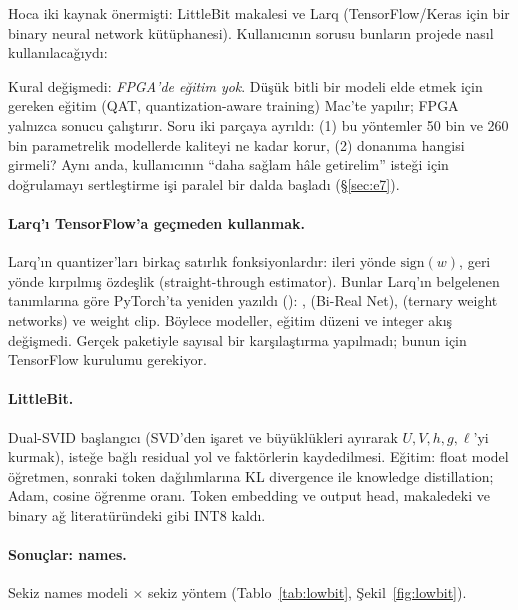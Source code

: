 
\neden
Hoca iki kaynak önermişti: LittleBit makalesi ve Larq (TensorFlow/Keras için bir binary neural network kütüphanesi). Kullanıcının sorusu bunların projede nasıl kullanılacağıydı:


Kural değişmedi: \emph{FPGA'de eğitim yok}. Düşük bitli bir modeli elde etmek için gereken eğitim (QAT, quantization-aware training) Mac'te yapılır; FPGA yalnızca sonucu çalıştırır. Soru iki parçaya ayrıldı: (1) bu yöntemler 50 bin ve 260 bin parametrelik modellerde kaliteyi ne kadar korur, (2) donanıma hangisi girmeli? Aynı anda, kullanıcının “daha sağlam hâle getirelim” isteği için doğrulamayı sertleştirme işi paralel bir dalda başladı (§\ref{sec:e7}).

\neyapildi
\paragraph{Larq'ı TensorFlow'a geçmeden kullanmak.} Larq'ın quantizer'ları birkaç satırlık fonksiyonlardır: ileri yönde $\mathrm{sign}(w)$, geri yönde kırpılmış özdeşlik (straight-through estimator). Bunlar Larq'ın belgelenen tanımlarına göre PyTorch'ta yeniden yazıldı (): ,  (Bi-Real Net),  (ternary weight networks) ve weight clip. Böylece modeller, eğitim düzeni ve integer akış değişmedi. Gerçek  paketiyle sayısal bir karşılaştırma yapılmadı; bunun için TensorFlow kurulumu gerekiyor.

\paragraph{LittleBit.} Dual-SVID başlangıcı (SVD'den işaret ve büyüklükleri ayırarak $U, V, h, g, \ell$'yi kurmak), isteğe bağlı residual yol ve faktörlerin kaydedilmesi. Eğitim: float model öğretmen, sonraki token dağılımlarına KL divergence ile knowledge distillation; Adam, cosine öğrenme oranı. Token embedding ve output head, makaledeki ve binary ağ literatüründeki gibi INT8 kaldı.

\paragraph{Sonuçlar: names.} Sekiz names modeli × sekiz yöntem (Tablo~\ref{tab:lowbit}, Şekil~\ref{fig:lowbit}).

